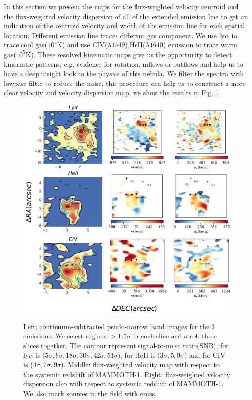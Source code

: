 \documentclass[../Results.tex]{subfiles}
\begin{document}
	In this section we present the maps for the flux-weighted velocity centroid and the flux-weighted velocity dispersion of all of the extended emission line to get an indication of the centroid velocity and width of the emission line for each spatial location. Different emission line traces different gas component. We use ly$\alpha$ to trace cool gas($10^{4}$K) and use CIV($\lambda1549$),HeII($\lambda1640$) emission to trace warm gas($10^{5}$K).  These resolved kinematic maps give us the opportunity to detect kinematic patterns, e.g. evidence for rotation, inflows or outflows and help us to have a deep insight look to the physics of this nebula. We filter the spectra with lowpass filter to reduce the noise, this procedure can help us to construct a more clear velocity and velocity dispersion map, we show the results in Fig. \ref{kinematicsmap}
	 \begin{figure}[htp]
		\centering
		\includegraphics[width=\textwidth]{figs/emissionmap}
		\label{kinematicsmap}
		\caption{Left: continuum-subtracted psudo-narrow band images for the 3 emissions. We select regions $> 1.5\sigma$ in each slice and stack these slices together. The contour represent signal-to-noise ratio(SNR), for ly$\alpha$ is ($5\sigma,9\sigma,18\sigma,30\sigma,42\sigma,51\sigma$), for HeII is ($3\sigma,5,9\sigma$) and for CIV is ($4\sigma,7\sigma,9\sigma$). Middle: flux-weighted velocity map with respect to the systemic redshift of MAMMOTH-1. Right: flux-weighted velocity dispersion also with respect to systemic redshift of MAMMOTH-1. We also mark sources in the field with cross.}
	\end{figure}
	
\end{document}
